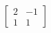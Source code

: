 \documentclass[preview]{standalone}
\begin{document}
\begin{align*}
\begin{bmatrix} 2 & -1 \\ 1 & 1 \end{bmatrix}
\end{align*}
\end{document}
